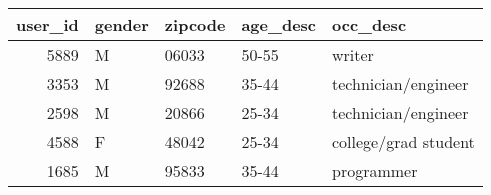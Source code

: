 \begin{tabular}{rllll}
\toprule
user_id & gender & zipcode & age_desc & occ_desc \\
\midrule
5889 & M & 06033 & 50-55 & writer \\
3353 & M & 92688 & 35-44 & technician/engineer \\
2598 & M & 20866 & 25-34 & technician/engineer \\
4588 & F & 48042 & 25-34 & college/grad student \\
1685 & M & 95833 & 35-44 & programmer \\
\bottomrule
\end{tabular}
